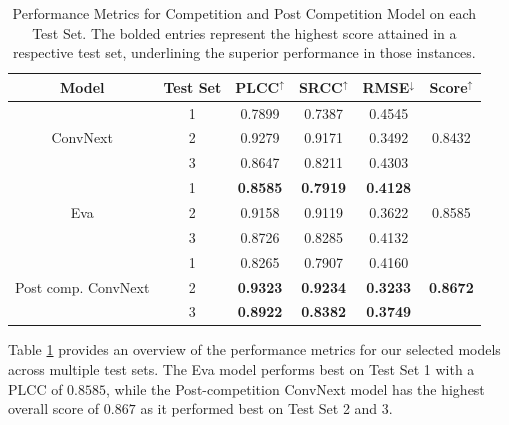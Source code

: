 \documentclass[a4paper,12pt,openright]{book}
\begin{document}
\begin{table}[h]

\smallskip
\begin{center}
\begin{tabular}{ | c | c | c | c | c | c | }
\hline  
  \textbf{Model} & \textbf{Test Set} & \textbf{PLCC$^{\uparrow}$} & \textbf{SRCC$^{\uparrow}$} & \textbf{RMSE$^{\downarrow}$} &
  \textbf{Score$^{\uparrow}$}\\ 
\hline  
  \multirow{3}{*}{ConvNext} & 1 & 0.7899 & 0.7387 & 0.4545 & \multirow{3}{*}{0.8432} \\
                            & 2 & 0.9279 & 0.9171 & 0.3492 & \\
                            & 3 & 0.8647 & 0.8211 & 0.4303 & \\
\hline
  \multirow{3}{*}{Eva} & 1 & \textbf{0.8585} & \textbf{0.7919} & \textbf{0.4128} & \multirow{3}{*}{0.8585}
  \\ & 2 & 0.9158 & 0.9119 & 0.3622 & \\
   & 3 & 0.8726 & 0.8285 & 0.4132 & \\
\hline

  \multirow{3}{*}{Post comp. ConvNext} & 1 & 0.8265 & 0.7907 & 0.4160 & \multirow{3}{*}{\textbf{0.8672}} \\
                            & 2 & \textbf{0.9323} & \textbf{ 0.9234} & \textbf{0.3233}  & \\
                            & 3 & \textbf{ 0.8922} & \textbf{0.8382} & \textbf{0.3749} & \\
\hline  
\end{tabular}
\end{center}
\caption{Performance Metrics for Competition and Post Competition Model on each Test Set. The bolded entries represent the highest score attained in a respective test set, underlining the superior performance in those instances.}
\label{res_test}
\end{table}

Table \ref{res_test} provides an overview of the performance metrics for our selected models across multiple test sets. The Eva model performs best on Test Set 1 with a PLCC of \(0.8585\), while the Post-competition ConvNext model has the highest overall score of \(0.867\) as it performed best on Test Set 2 and 3.
\end{document}
